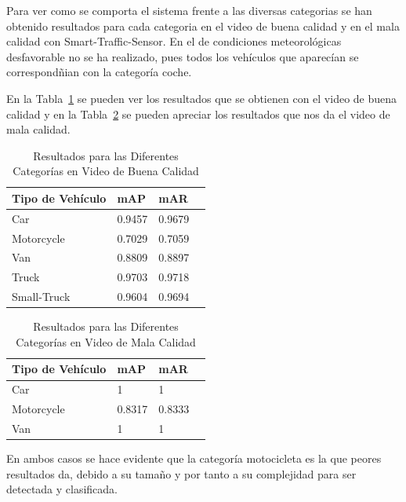 Para ver como se comporta el sistema frente a las diversas categorias se han obtenido resultados para cada categoria en el video de buena calidad y en el mala calidad con Smart-Traffic-Sensor. En el de condiciones meteorológicas desfavorable no se ha realizado, pues todos los vehículos que aparecían se correspondñian con la categoría coche.

En la Tabla~\ref{resultados_categoria_video_buena_calidad} se pueden ver los resultados que se obtienen con el video de buena calidad y en la Tabla~\ref{resultados_categoria_video_mala_calidad} se pueden apreciar los resultados que nos da el video de mala calidad.

\begin{table}[htbp]
\begin{center}
\begin{tabular}{|l|l|l|l|}
\hline
Tipo de Vehículo & mAP & mAR  \\ 
\hline \hline
Car & 0.9457 & 0.9679 \\ \hline
Motorcycle & 0.7029 & 0.7059 \\ \hline
Van & 0.8809 & 0.8897\\ \hline
Truck & 0.9703 & 0.9718\\ \hline
Small-Truck & 0.9604 & 0.9694\\ \hline
\end{tabular}
\caption{Resultados para las Diferentes Categorías en Video de Buena Calidad}
\label{resultados_categoria_video_buena_calidad}
\end{center}
\end{table}

\begin{table}[htbp]
\begin{center}
\begin{tabular}{|l|l|l|l|}
\hline
Tipo de Vehículo & mAP & mAR  \\ 
\hline \hline
Car & 1 & 1 \\ \hline
Motorcycle & 0.8317 & 0.8333 \\ \hline
Van & 1 & 1 \\ \hline
\end{tabular}
\caption{Resultados para las Diferentes Categorías en Video de Mala Calidad}
\label{resultados_categoria_video_mala_calidad}
\end{center}
\end{table}

En ambos casos se hace evidente que la categoría motocicleta es la que peores resultados da, debido a su tamaño y por tanto a su complejidad para ser detectada y clasificada.



